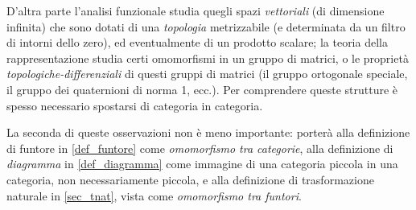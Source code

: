 D'altra parte l'analisi funzionale studia quegli spazi \emph{vettoriali} (di dimensione infinita) che sono dotati di una \emph{topologia} metrizzabile (e determinata da un filtro di intorni dello zero), ed eventualmente di un prodotto scalare; la teoria della rappresentazione studia certi omomorfismi in un gruppo di matrici, o le proprietà \emph{topologiche-differenziali} di questi gruppi di matrici (il gruppo ortogonale speciale, il gruppo dei quaternioni di norma 1, ecc.). Per comprendere queste strutture è spesso necessario spostarsi di categoria in categoria.

La seconda di queste osservazioni non è meno importante: porterà alla definizione di funtore in \ref{def_funtore} come \emph{omomorfismo tra categorie}, alla definizione di \emph{diagramma} in \ref{def_diagramma} come immagine di una categoria piccola in una categoria, non necessariamente piccola, e alla definizione di trasformazione naturale in \ref{sec_tnat}, vista come \emph{omomorfismo tra funtori}.
